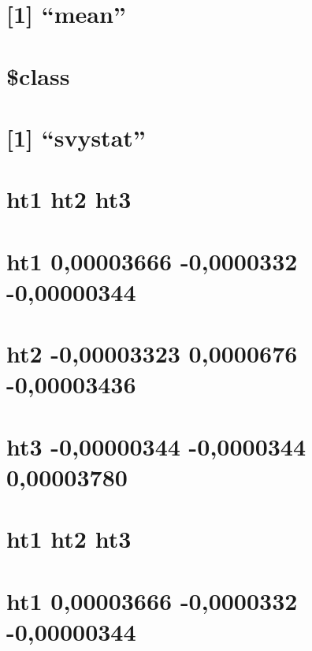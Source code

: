 \documentclass[]{book}
\theoremstyle{definition}
\theoremstyle{definition}
\theoremstyle{definition}
\theoremstyle{remark}
\begin{document}
\section{\texorpdfstring{{[}1{]} ``mean''}{{[}1{]} mean}}\label{mean}

\section{}\label{section-41}

\section{\$class}\label{class}

\section{\texorpdfstring{{[}1{]}
``svystat''}{{[}1{]} svystat}}\label{svystat}

\section{ht1 ht2 ht3}\label{ht1-ht2-ht3-3}

\section{ht1 0,00003666 -0,0000332
-0,00000344}\label{ht1-000003666--00000332--000000344-1}

\section{ht2 -0,00003323 0,0000676
-0,00003436}\label{ht2--000003323-00000676--000003436-1}

\section{ht3 -0,00000344 -0,0000344
0,00003780}\label{ht3--000000344--00000344-000003780-1}

\section{ht1 ht2 ht3}\label{ht1-ht2-ht3-4}

\section{ht1 0,00003666 -0,0000332
-0,00000344}\label{ht1-000003666--00000332--000000344-2}
\end{document}
